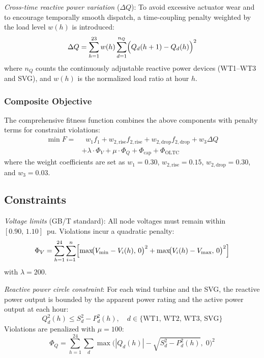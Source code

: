 \textit{Cross-time reactive power variation} ($\Delta Q$): To avoid excessive actuator wear and to encourage temporally smooth dispatch, a time-coupling penalty weighted by the load level $w(h)$ is introduced:
\begin{equation}
\Delta Q = \sum_{h=1}^{23} w(h) \sum_{d=1}^{n_Q} \Bigl(Q_d(h+1) - Q_d(h)\Bigr)^2
\label{eq:delta_q}
\end{equation}
where $n_Q$ counts the continuously adjustable reactive power devices (WT1--WT3 and SVG), and $w(h)$ is the normalized load ratio at hour $h$.

\subsubsection{Composite Objective}

The comprehensive fitness function combines the above components with penalty terms for constraint violations:
\begin{equation}
\begin{aligned}
\min F = &\;\; w_1 f_1 + w_{2,\text{rise}} f_{2,\text{rise}} + w_{2,\text{drop}} f_{2,\text{drop}} + w_3 \Delta Q \\
        &+ \lambda \cdot \Phi_V + \mu \cdot \Phi_Q + \Phi_{\text{cap}} + \Phi_{\text{OLTC}}
\label{eq:comprehensive_objective}
\end{aligned}
\end{equation}
where the weight coefficients are set as $w_1=0.30$, $w_{2,\text{rise}}=0.15$, $w_{2,\text{drop}}=0.30$, and $w_3=0.03$.

\subsection{Constraints}

\textit{Voltage limits} (GB/T standard): All node voltages must remain within $[0.90,\,1.10]$~pu. Violations incur a quadratic penalty:
\begin{equation}
\Phi_V = \sum_{h=1}^{24} \sum_{i=1}^{n} \Bigl[\max\!\bigl(V_{\min} - V_i(h),\,0\bigr)^2 + \max\!\bigl(V_i(h) - V_{\max},\,0\bigr)^2\Bigr]
\label{eq:voltage_penalty}
\end{equation}
with $\lambda = 200$.

\textit{Reactive power circle constraint}: For each wind turbine and the SVG, the reactive power output is bounded by the apparent power rating and the active power output at each hour:
\begin{equation}
Q_{d}^2(h) \leq S_{d}^2 - P_{d}^2(h), \quad d \in \{\text{WT1, WT2, WT3, SVG}\}
\label{eq:circle_constraint}
\end{equation}
Violations are penalized with $\mu = 100$:
\begin{equation}
\Phi_Q = \sum_{h=1}^{24} \sum_{d} \max\!\bigl(|Q_d(h)| - \sqrt{S_d^2 - P_d^2(h)},\; 0\bigr)^2
\label{eq:circle_penalty}
\end{equation}

